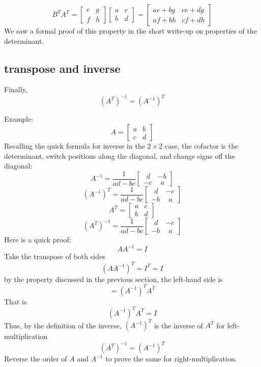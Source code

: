 \documentclass[11pt, oneside]{article}   	%
\begin{document}
\[ B^T A^T = 
\begin{bmatrix}
e & g \\
f & h 
\end{bmatrix} 
\begin{bmatrix}
a & c \\
b & d 
\end{bmatrix} 
=
\begin{bmatrix}
ae + bg & ce + dg \\
af + bh & cf + dh 
\end{bmatrix}
\]
We saw a formal proof of this property in the short write-up on properties of the determinant.

\subsection*{transpose and inverse}
Finally,
\[ (A^T)^{-1} = (A^{-1})^T \]

Example:
\[ A = 
\begin{bmatrix}
a & b \\
c & d 
\end{bmatrix} 
\]
Recalling the quick formula for inverse in the $2 \times 2$ case, the cofactor is the determinant, switch positions along the diagonal, and change signs off the diagonal:
\[ A^{-1} = 
\frac{1}{ad-bc}
\begin{bmatrix}
\ \ d & -b \\
-c & \ \ a 
\end{bmatrix} 
\]
\[ (A^{-1})^T = 
\frac{1}{ad-bc}
\begin{bmatrix}
\ \ d & -c \\
-b & \ \ a 
\end{bmatrix} 
\]
\[ A^T = 
\begin{bmatrix}
a & c \\
b & d 
\end{bmatrix} 
\]
\[ (A^T)^{-1} = 
\frac{1}{ad-bc}
\begin{bmatrix}
\ \ d & -c \\
-b & \ \ a 
\end{bmatrix} 
\]
Here is a quick proof:
\[ A A^{-1} = I \]
Take the transpose of both sides
\[ (A A^{-1})^T = I^T = I \]
by the property discussed in the previous section, the left-hand side is
\[ = (A^{-1})^T A^T \]
That is
\[ (A^{-1})^T A^T = I \]
Thus, by the definition of the inverse, $(A^{-1})^T$ is the inverse of $A^T$ for left-multiplication
\[ (A^T)^{-1} = (A^{-1})^T  \]
Reverse the order of $A$ and $A^{-1}$ to prove the same for right-multiplication.
\end{document}
